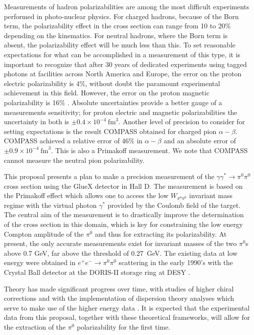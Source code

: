 Measurements of hadron polarizabilities are among the most difficult
experiments performed in photo-nuclear physics. For charged hadrons,
because of the Born term, the polarizability effect in the cross
section can range from 10 to 20\% depending on the kinematics.  For
neutral hadrons, where the Born term is absent, the polarizability
effect will be much less than this.  To set reasonable expectations
for what can be accomplished in a measurement of this type, it is
important to recognize that after 30 years of dedicated experiments
using tagged photons at facilities across North America and Europe,
the error on the proton electric polarizability is 4\%, without doubt
the paramount experimental achievement in this field. However, the
error on the proton magnetic polarizability is 16\%
\cite{PDGTanabashi:2018oca}.  Absolute uncertainties provide a better
gauge of a measurements sensitivity; for proton electric and magnetic
polarizabilities the uncertainty in both is $\pm 0.4 \times
10^{-4}~\mathrm{fm}^3$.  Another level of precision to consider for
setting expectations is the result COMPASS obtained for charged pion
$\alpha - \beta$. COMPASS
achieved a relative error of 46\% in $\alpha - \beta$ and an absolute
error of $\pm 0.9 \times 10^{-4}~\mathrm{fm}^3$. This is also a Primakoff
measurement. We note that COMPASS cannot
measure the neutral pion polarizability.



This proposal presents a plan to make a precision measurement of the
$\gamma \gamma^* \rightarrow \pi^0 \pi^0$ cross section using the
GlueX detector in Hall D.  The measurement is based on the Primakoff
effect which allows one to access the low $W_{\pi^0\pi^0}$ invariant
mass regime with the virtual photon $\gamma^*$ provided by the
Coulomb field of the target. The central aim of the measurement is to
drastically improve the determination of the cross section in this
domain, which is key for constraining the low energy Compton amplitude
of the $\pi^0$ and thus for extracting its polarizability.  At
present, the only accurate measurements exist for invariant masses of
the two $\pi^0$s above 0.7 GeV, far above the threshold of 0.27~GeV. The
existing data at low energy were obtained in $e^+ e^- \to \pi^0\pi^0 $
scattering in the early 1990's with the Crystal Ball detector at the
DORIS-II storage ring at DESY \cite{Marsiske:1990hx}.

Theory has made significant progress over time, with
studies of higher chiral corrections 
\cite{Bellucci:1994eb,Gasser:2005ud,Aleksejevs:2014eea} and with the
implementation of dispersion theory analyses which serve to make use
of the higher energy data
\cite{Oller:2008kf,Dai:2014zta,Dai:2014lza,Moussallam:2013una}. It is
expected that the experimental data from this proposal, together with
these theoretical frameworks, will allow for the
extraction of the $\pi^0$ polarizability for the first time.
